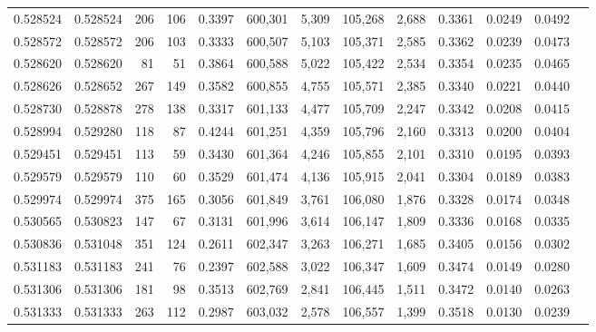 \begin{tabular}{rrrrrrrrrrrrr}
0.528524 & 0.528524 &   206 &   106 &                                     0.3397 & 600,301 &   5,309 & 105,268 &   2,688 & 0.3361 & 0.0249 & 0.0492 \\
0.528572 & 0.528572 &   206 &   103 &                                     0.3333 & 600,507 &   5,103 & 105,371 &   2,585 & 0.3362 & 0.0239 & 0.0473 \\
0.528620 & 0.528620 &    81 &    51 &                                     0.3864 & 600,588 &   5,022 & 105,422 &   2,534 & 0.3354 & 0.0235 & 0.0465 \\
0.528626 & 0.528652 &   267 &   149 &                                     0.3582 & 600,855 &   4,755 & 105,571 &   2,385 & 0.3340 & 0.0221 & 0.0440 \\
0.528730 & 0.528878 &   278 &   138 &                                     0.3317 & 601,133 &   4,477 & 105,709 &   2,247 & 0.3342 & 0.0208 & 0.0415 \\
0.528994 & 0.529280 &   118 &    87 &                                     0.4244 & 601,251 &   4,359 & 105,796 &   2,160 & 0.3313 & 0.0200 & 0.0404 \\
0.529451 & 0.529451 &   113 &    59 &                                     0.3430 & 601,364 &   4,246 & 105,855 &   2,101 & 0.3310 & 0.0195 & 0.0393 \\
0.529579 & 0.529579 &   110 &    60 &                                     0.3529 & 601,474 &   4,136 & 105,915 &   2,041 & 0.3304 & 0.0189 & 0.0383 \\
0.529974 & 0.529974 &   375 &   165 &                                     0.3056 & 601,849 &   3,761 & 106,080 &   1,876 & 0.3328 & 0.0174 & 0.0348 \\
0.530565 & 0.530823 &   147 &    67 &                                     0.3131 & 601,996 &   3,614 & 106,147 &   1,809 & 0.3336 & 0.0168 & 0.0335 \\
0.530836 & 0.531048 &   351 &   124 &                                     0.2611 & 602,347 &   3,263 & 106,271 &   1,685 & 0.3405 & 0.0156 & 0.0302 \\
0.531183 & 0.531183 &   241 &    76 &                                     0.2397 & 602,588 &   3,022 & 106,347 &   1,609 & 0.3474 & 0.0149 & 0.0280 \\
0.531306 & 0.531306 &   181 &    98 &                                     0.3513 & 602,769 &   2,841 & 106,445 &   1,511 & 0.3472 & 0.0140 & 0.0263 \\
0.531333 & 0.531333 &   263 &   112 &                                     0.2987 & 603,032 &   2,578 & 106,557 &   1,399 & 0.3518 & 0.0130 & 0.0239 \\

\end{tabular}
